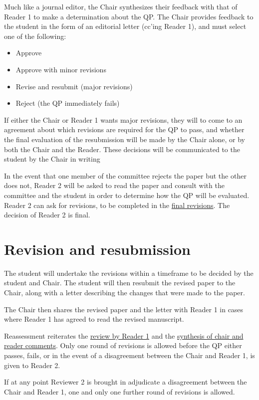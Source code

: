 \documentclass[
]{book}
\providecommand{\tightlist}{%
  \setlength{\itemsep}{0pt}\setlength{\parskip}{0pt}}
\begin{document}
Much like a journal editor, the Chair synthesizes their feedback with that of Reader 1 to make a determination about the QP. The Chair provides feedback to the student in the form of an editorial letter (cc'ing Reader 1), and must select one of the following:

\begin{itemize}
\tightlist
\item
  Approve
\item
  Approve with minor revisions
\item
  Revise and resubmit (major revisions)
\item
  Reject (the QP immediately fails)
\end{itemize}

If either the Chair or Reader 1 wants major revisions, they will to come to an agreement about which revisions are required for the QP to pass, and whether the final evaluation of the resubmission will be made by the Chair alone, or by both the Chair and the Reader. These decisions will be communicated to the student by the Chair in writing

In the event that one member of the committee rejects the paper but the other does not, Reader 2 will be asked to read the paper and consult with the committee and the student in order to determine how the QP will be evaluated. Reader 2 can ask for revisions, to be completed in the \hyperref[revisions]{final revisions}. The decision of Reader 2 is final.

\section{Revision and resubmission}\label{revisions}

The student will undertake the revisions within a timeframe to be decided by the student and Chair. The student will then resubmit the revised paper to the Chair, along with a letter describing the changes that were made to the paper.

The Chair then shares the revised paper and the letter with Reader 1 in cases where Reader 1 has agreed to read the revised manuscript.

Reassessment reiterates the \hyperref[reader1]{review by Reader 1} and the \hyperref[synthesis]{synthesis of chair and reader comments}. Only one round of revisions is allowed before the QP either passes, fails, or in the event of a disagreement between the Chair and Reader 1, is given to Reader 2.

If at any point Reviewer 2 is brought in adjudicate a disagreement between the Chair and Reader 1, one and only one further round of revisions is allowed.
\end{document}
